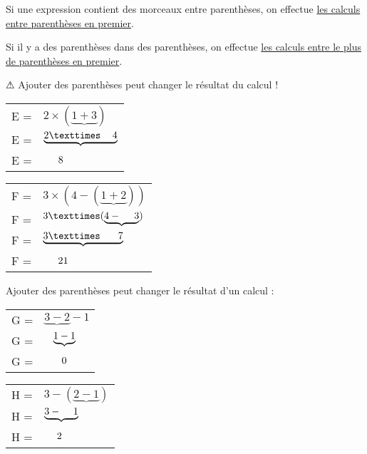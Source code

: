 \documentclass[../€Cours-complet/Cours-complet]{subfiles}
\begin{document}
\begin{cours}
	Si une expression contient des morceaux entre parenthèses, on effectue \uline{les calculs entre parenthèses en premier}.

	Si il y a des parenthèses dans des parenthèses, on effectue
	\uline{les calculs entre le plus de parenthèses en premier}.

	{\color{red} ⚠ Ajouter des parenthèses peut changer le résultat du calcul !}
\end{cours}

\newpage

\begin{exemple}
	\begin{minipage}{0.5\textwidth}
		\begin{tabular}{ll}
			E = & $2 × (\underbrace{1 + 3})$          \\
			E = & $\underbrace{2 × \hspace{1.2em} 4}$ \\
			E = & $\hspace{1.5em}8$
		\end{tabular}
	\end{minipage}
	\begin{minipage}{0.5\textwidth}
		\begin{tabular}{ll}
			F = & $3 × (4 - (\underbrace{1 + 2}))$         \\
			F = & $3 × (\underbrace{4 - \hspace{1.3em}3})$ \\
			F = & $\underbrace{3 × \hspace{1.8em}7}$       \\
			F = & $\hspace{1.5em}21$
		\end{tabular}
	\end{minipage}
\end{exemple}

\begin{exemple}
	Ajouter des parenthèses peut changer le résultat d'un calcul :

	\begin{minipage}{0.5\textwidth}
		\begin{tabular}{ll}
			G = & $\underbrace{3 - 2} - 1$           \\
			G = & $\hspace{0.9em}\underbrace{1 - 1}$ \\
			G = & $\hspace{1.7em}0$
		\end{tabular}
	\end{minipage}
	\begin{minipage}{0.5\textwidth}
		\begin{tabular}{ll}
			H = & $3 - (\underbrace{2 - 1})$          \\
			H = & $\underbrace{3 - \hspace{1.2em} 1}$ \\
			H = & $\hspace{1.3em}2$
		\end{tabular}
	\end{minipage}
\end{exemple}
\end{document}
